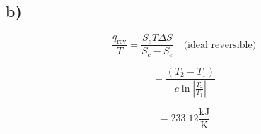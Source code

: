

\subsection*{b)}
\[
\frac{q_{\text{rev}}}{T} = \frac{S_e T \Delta S}{S_c - S_e} \quad \text{(ideal reversible)}
\]

\[
= \frac{(T_2 - T_1)}{c \ln \left| \frac{T_2}{T_1} \right|}
\]

\[
= 233.12 \frac{\text{kJ}}{\text{K}}
\]